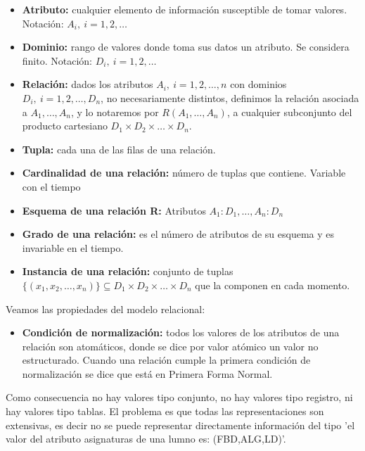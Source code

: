 \documentclass[a4paper,11pt]{article}
\begin{document}
\begin{itemize}
\item \textbf{Atributo:} cualquier elemento de información susceptible de tomar valores. Notación: $A_i, \> i=1,2,\ldots$

\item \textbf{Dominio:} rango de valores donde toma sus datos un atributo. Se considera finito. Notación: $D_i, \> i=1,2,\ldots$

\item \textbf{Relación:} dados los atributos $A_i, \> i=1,2,\ldots,n$ con dominios $D_i, \> i=1,2,\ldots,D_n$, no necesariamente distintos, definimos la relación asociada a $A_1,\ldots,A_n$, y lo notaremos por $R(A_1,\ldots,A_n)$, a cualquier subconjunto del producto cartesiano $D_1\times D_2 \times \ldots \times D_n$.

\item \textbf{Tupla:} cada una de las filas de una relación.

\item \textbf{Cardinalidad de una relación:} número de tuplas que contiene. Variable con el tiempo

\item \textbf{Esquema de una relación R:} Atributos $A_1:D_1,\ldots,A_n:D_n$

\item \textbf{Grado de una relación:} es el número de atributos de su esquema y es invariable en el tiempo.

\item \textbf{Instancia de una relación:} conjunto de tuplas $\{(x_1,x_2,\ldots,x_n)\}\subseteq D_1\times D_2 \times \ldots \times D_n$ que la componen en cada momento.
\end{itemize}

Veamos las propiedades del modelo relacional:

\begin{itemize}
\item \textbf{Condición de normalización:} todos los valores de los atributos de una relación son atomáticos, donde se dice por valor atómico un valor no estructurado. Cuando una relación cumple la primera condición de normalización se dice que está en Primera Forma Normal.
\end{itemize}

Como consecuencia no hay valores tipo conjunto, no hay valores tipo registro, ni hay valores tipo tablas. El problema es que todas las representaciones son extensivas, es decir no se puede representar directamente información del tipo 'el valor del atributo asignaturas de una lumno es: (FBD,ALG,LD)'. \\
\end{document}
